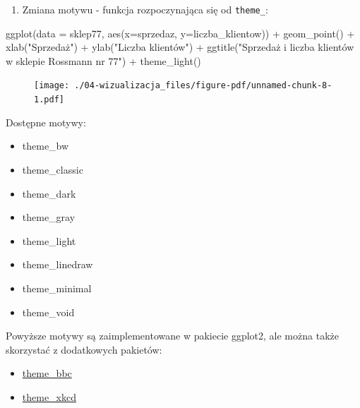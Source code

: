 \documentclass[
  letterpaper,
  DIV=11,
  numbers=noendperiod]{scrreprt}
\newenvironment{Shaded}{\begin{snugshade}}{\end{snugshade}}
\newcommand{\AttributeTok}[1]{\textcolor[rgb]{0.40,0.45,0.13}{#1}}
\newcommand{\FunctionTok}[1]{\textcolor[rgb]{0.28,0.35,0.67}{#1}}
\newcommand{\NormalTok}[1]{\textcolor[rgb]{0.00,0.23,0.31}{#1}}
\newcommand{\SpecialCharTok}[1]{\textcolor[rgb]{0.37,0.37,0.37}{#1}}
\newcommand{\StringTok}[1]{\textcolor[rgb]{0.13,0.47,0.30}{#1}}
\providecommand{\tightlist}{%
  \setlength{\itemsep}{0pt}\setlength{\parskip}{0pt}}\usepackage{longtable,booktabs,array}
\begin{document}
\begin{enumerate}
\def\labelenumi{\arabic{enumi}.}
\setcounter{enumi}{4}
\tightlist
\item
  Zmiana motywu - funkcja rozpoczynająca się od \texttt{theme\_}:
\end{enumerate}

\begin{Shaded}
\begin{Highlighting}[]
\FunctionTok{ggplot}\NormalTok{(}\AttributeTok{data =}\NormalTok{ sklep77, }\FunctionTok{aes}\NormalTok{(}\AttributeTok{x=}\NormalTok{sprzedaz, }\AttributeTok{y=}\NormalTok{liczba\_klientow)) }\SpecialCharTok{+}
  \FunctionTok{geom\_point}\NormalTok{() }\SpecialCharTok{+}
  \FunctionTok{xlab}\NormalTok{(}\StringTok{"Sprzedaż"}\NormalTok{) }\SpecialCharTok{+}
  \FunctionTok{ylab}\NormalTok{(}\StringTok{"Liczba klientów"}\NormalTok{) }\SpecialCharTok{+}
  \FunctionTok{ggtitle}\NormalTok{(}\StringTok{"Sprzedaż i liczba klientów w sklepie Rossmann nr 77"}\NormalTok{) }\SpecialCharTok{+}
  \FunctionTok{theme\_light}\NormalTok{()}
\end{Highlighting}
\end{Shaded}

\begin{figure}[H]

{\centering \texttt{[image: ./04-wizualizacja\_files/figure-pdf/unnamed-chunk-8-1.pdf]}

}

\end{figure}

Dostępne motywy:

\begin{itemize}
\tightlist
\item
  theme\_bw
\item
  theme\_classic
\item
  theme\_dark
\item
  theme\_gray
\item
  theme\_light
\item
  theme\_linedraw
\item
  theme\_minimal
\item
  theme\_void
\end{itemize}

Powyższe motywy są zaimplementowane w pakiecie ggplot2, ale można także
skorzystać z dodatkowych pakietów:

\begin{itemize}
\tightlist
\item
  \href{https://github.com/bbc/bbplot}{theme\_bbc}
\item
  \href{https://cran.r-project.org/web/packages/xkcd/}{theme\_xkcd}
\end{itemize}
\end{document}
